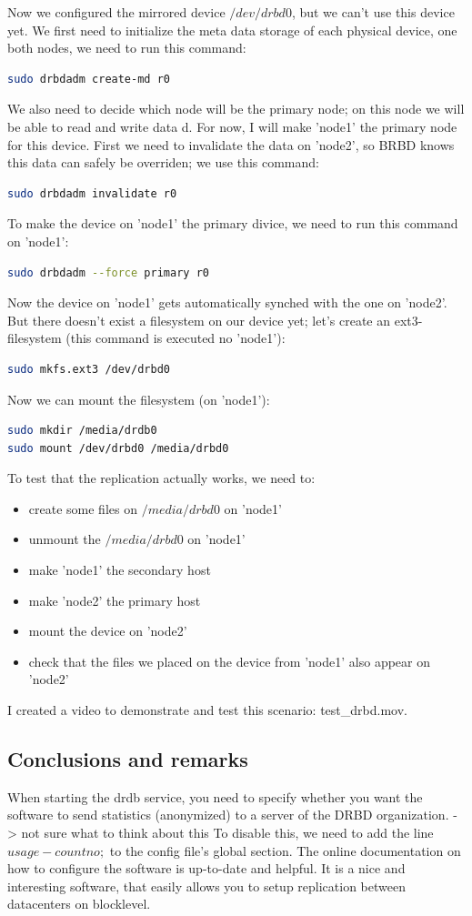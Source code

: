 \documentclass[12pt]{report}
\begin{document}
Now we configured the mirrored device $/dev/drbd0$, but we can't use
this device yet.
We first need to initialize the meta data storage of each physical
device,
one both nodes, we need to run this command:
\begin{lstlisting}[language=bash]
sudo drbdadm create-md r0
\end{lstlisting}
We also need to decide which node will be the primary node; on this
node we will be able to read and write data d.
For now, I will make 'node1' the primary node for this device.
First we need to invalidate the data on 'node2', so BRBD knows this
data can safely be overriden; we use this command:
\begin{lstlisting}[language=bash]
sudo drbdadm invalidate r0
\end{lstlisting}
To make the device on 'node1' the primary divice,
we need to run this command on 'node1':
\begin{lstlisting}[language=bash]
sudo drbdadm --force primary r0
\end{lstlisting}
Now the device on 'node1' gets automatically synched with the one on
'node2'. But there doesn't exist a filesystem on our device yet; let's
create an ext3-filesystem (this command is executed no 'node1'):
\begin{lstlisting}[language=bash]
sudo mkfs.ext3 /dev/drbd0
\end{lstlisting}
Now we can mount the filesystem (on 'node1'):
\begin{lstlisting}[language=bash]
sudo mkdir /media/drdb0
sudo mount /dev/drbd0 /media/drbd0 
\end{lstlisting}
To test that the replication actually works, we need to:
\begin{itemize}
\item create some files on $/media/drbd0$ on 'node1'
\item unmount the $/media/drbd0$ on 'node1'
\item make 'node1' the secondary host
\item make 'node2' the primary host
\item mount the device on 'node2'
\item check that the files we placed on the device from 'node1' also
  appear on 'node2'
\end{itemize}
I created a video to demonstrate and test this scenario:
test\_drbd.mov.

\subsection{Conclusions and remarks}
When starting the drdb service, you need to specify
whether you want the software to send statistics (anonymized) to a
server of the DRBD organization. -> not sure what to think about this
To disable this, we need to add the line $usage-count no;$ to the config file's
global section.
The online documentation on how to configure the software is
up-to-date and helpful. It is a nice and interesting software, that easily allows you
to setup replication between datacenters on blocklevel.
\end{document}
